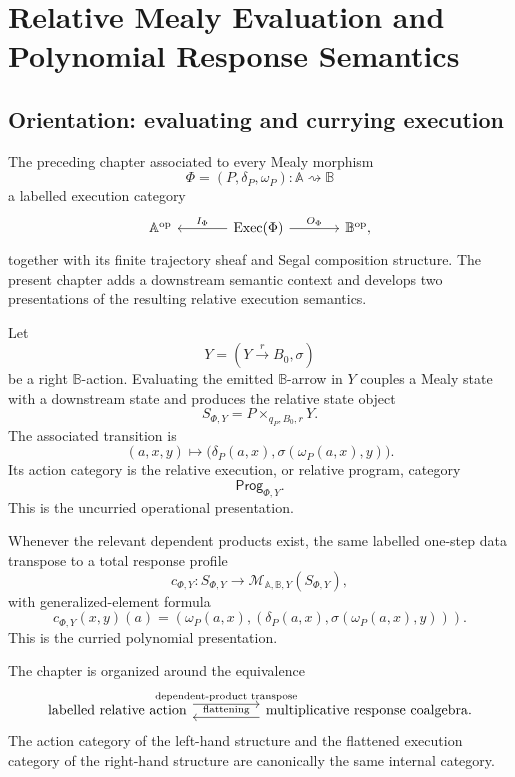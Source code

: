 \chapter{Relative Mealy Evaluation and Polynomial Response Semantics}
\label{ch:relative-mealy-evaluation-polynomial-response}
\label{ch:relative-mealy-program-categories}
\label{ch:polynomial-relative-mealy-actions}

\section{Orientation: evaluating and currying execution}
\label{sec:relative-response-orientation}

The preceding chapter associated to every Mealy morphism
\[
    \Phi=(P,\delta_P,\omega_P):
    \mathbb A\rightsquigarrow\mathbb B
\]
a labelled execution category
\[
\begin{tikzcd}[column sep=large]
    \mathbb A^{\mathrm{op}}
    &
    \operatorname{Exec}(\Phi)
        \arrow[l,"I_\Phi"']
        \arrow[r,"O_\Phi"]
    &
    \mathbb B^{\mathrm{op}},
\end{tikzcd}
\]
together with its finite trajectory sheaf and Segal composition structure.
The present chapter adds a downstream semantic context and develops two
presentations of the resulting relative execution semantics.

Let
\[
    Y=(Y\xrightarrow{r}B_0,\sigma)
\]
be a right \(\mathbb B\)-action.  Evaluating the emitted
\(\mathbb B\)-arrow in \(Y\) couples a Mealy state with a downstream state and
produces the relative state object
\[
    S_{\Phi,Y}=P\times_{q_P,B_0,r}Y.
\]
The associated transition is
\[
    (a,x,y)
    \longmapsto
    \bigl(
        \delta_P(a,x),
        \sigma(\omega_P(a,x),y)
    \bigr).
\]
Its action category is the relative execution, or relative program, category
\[
    \mathsf{Prog}_{\Phi,Y}.
\]
This is the uncurried operational presentation.

Whenever the relevant dependent products exist, the same labelled one-step
data transpose to a total response profile
\[
    c_{\Phi,Y}:
    S_{\Phi,Y}
    \longrightarrow
    \mathcal M_{\mathbb A,\mathbb B,Y}(S_{\Phi,Y}),
\]
with generalized-element formula
\[
    c_{\Phi,Y}(x,y)(a)
    =
    \left(
        \omega_P(a,x),
        \left(
            \delta_P(a,x),
            \sigma(\omega_P(a,x),y)
        \right)
    \right).
\]
This is the curried polynomial presentation.

The chapter is organized around the equivalence
\[
\begin{tikzcd}[column sep=huge]
    \text{labelled relative action}
        \arrow[r,shift left=1.1ex,"\text{dependent-product transpose}"]
    &
    \text{multiplicative response coalgebra}
        \arrow[l,shift left=1.1ex,"\text{flattening}"'].
\end{tikzcd}
\]
The action category of the left-hand structure and the flattened execution
category of the right-hand structure are canonically the same internal
category.

